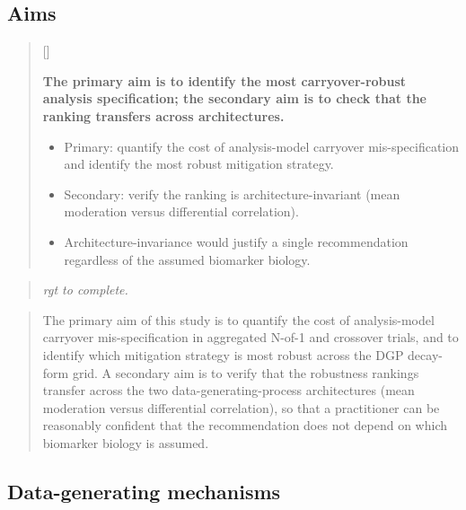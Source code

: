 \documentclass[
  11pt,
]{article}
\newcounter{pgraph}
\newenvironment{bullets}{%
  \stepcounter{pgraph}%
  \begin{quote}\small\sffamily\color[gray]{0.30}%
  {\normalfont\scriptsize\color[gray]{0.58}[\thepgraph]\enspace}}{%
  \end{quote}}
\newenvironment{rgt}{%
  \begin{quote}\small\itshape\color[RGB]{20,60,160}}{%
  \end{quote}}
\newenvironment{orig}{%
  \begin{quote}\normalsize\color[gray]{0.55}}{%
  \end{quote}}
\begin{document}
\subsection{Aims}\label{aims}

\begin{bullets}

\textbf{The primary aim is to identify the most carryover-robust
analysis specification; the secondary aim is to check that the
ranking transfers across architectures.}

\begin{itemize}\setlength{\itemsep}{2pt}\setlength{\parskip}{0pt}
\item Primary: quantify the cost of analysis-model carryover
mis-specification and identify the most robust mitigation strategy.
\item Secondary: verify the ranking is architecture-invariant (mean
moderation versus differential correlation).
\item Architecture-invariance would justify a single recommendation
regardless of the assumed biomarker biology.
\end{itemize}

\end{bullets}

\begin{rgt}
rgt to complete.

\end{rgt}

\begin{orig}
The primary aim of this study is to quantify the cost of
analysis-model carryover mis-specification in aggregated N-of-1
and crossover trials, and to identify which mitigation strategy
is most robust across the DGP decay-form grid. A secondary aim
is to verify that the robustness rankings transfer across the two
data-generating-process architectures (mean moderation versus
differential correlation), so that a practitioner can be
reasonably confident that the recommendation does not depend on
which biomarker biology is assumed.

\end{orig}

\subsection{Data-generating mechanisms}\label{data-generating-mechanisms}
\end{document}
